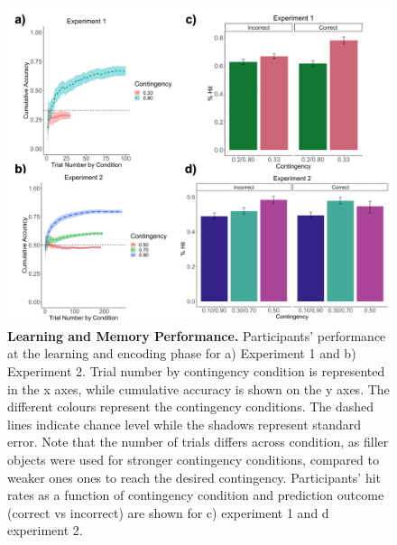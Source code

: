 \documentclass[a4paper,12pt]{article}
\begin{document}
\begin{figure}[ht!]
\centerline
{\includegraphics[width=1\textwidth]{figures/model_free_plots.png} }
\caption{\textbf{Learning and Memory Performance.} Participants' performance at the learning and encoding phase for a) Experiment 1 and b) Experiment 2. Trial number by contingency condition is represented in the x axes, while cumulative accuracy is shown on the y axes. The different colours represent the contingency conditions. The dashed lines indicate chance level while the shadows represent standard error. Note that the number of trials differs across condition, as filler objects were used for stronger contingency conditions, compared to weaker ones ones to reach the desired contingency. Participants' hit rates as a function of contingency condition and prediction outcome (correct vs incorrect) are shown for c) experiment 1 and d experiment 2.}
\label{fig:mod_free}
\end{figure}
\end{document}
